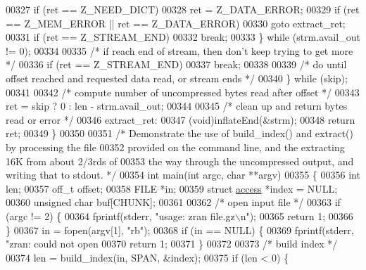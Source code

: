 \begin{DoxyCode}
00327             \textcolor{keywordflow}{if} (ret == Z\_NEED\_DICT)
00328                 ret = Z\_DATA\_ERROR;
00329             \textcolor{keywordflow}{if} (ret == Z\_MEM\_ERROR || ret == Z\_DATA\_ERROR)
00330                 \textcolor{keywordflow}{goto} extract\_ret;
00331             \textcolor{keywordflow}{if} (ret == Z\_STREAM\_END)
00332                 \textcolor{keywordflow}{break};
00333         \} \textcolor{keywordflow}{while} (strm.avail\_out != 0);
00334 
00335         \textcolor{comment}{/* if reach end of stream, then don't keep trying to get more */}
00336         \textcolor{keywordflow}{if} (ret == Z\_STREAM\_END)
00337             \textcolor{keywordflow}{break};
00338 
00339         \textcolor{comment}{/* do until offset reached and requested data read, or stream ends */}
00340     \} \textcolor{keywordflow}{while} (skip);
00341 
00342     \textcolor{comment}{/* compute number of uncompressed bytes read after offset */}
00343     ret = skip ? 0 : len - strm.avail\_out;
00344 
00345     \textcolor{comment}{/* clean up and return bytes read or error */}
00346   extract\_ret:
00347     (void)inflateEnd(&strm);
00348     \textcolor{keywordflow}{return} ret;
00349 \}
00350 
00351 \textcolor{comment}{/* Demonstrate the use of build\_index() and extract() by processing the file}
00352 \textcolor{comment}{   provided on the command line, and the extracting 16K from about 2/3rds of}
00353 \textcolor{comment}{   the way through the uncompressed output, and writing that to stdout. */}
00354 \textcolor{keywordtype}{int} main(\textcolor{keywordtype}{int} argc, \textcolor{keywordtype}{char} **argv)
00355 \{
00356     \textcolor{keywordtype}{int} len;
00357     off\_t offset;
00358     FILE *in;
00359     \textcolor{keyword}{struct }\hyperlink{structaccess}{access} *index = NULL;
00360     \textcolor{keywordtype}{unsigned} \textcolor{keywordtype}{char} buf[CHUNK];
00361 
00362     \textcolor{comment}{/* open input file */}
00363     \textcolor{keywordflow}{if} (argc != 2) \{
00364         fprintf(stderr, \textcolor{stringliteral}{"usage: zran file.gz\(\backslash\)n"});
00365         \textcolor{keywordflow}{return} 1;
00366     \}
00367     in = fopen(argv[1], \textcolor{stringliteral}{"rb"});
00368     \textcolor{keywordflow}{if} (in == NULL) \{
00369         fprintf(stderr, \textcolor{stringliteral}{"zran: could not open %
00370         \textcolor{keywordflow}{return} 1;
00371     \}
00372 
00373     \textcolor{comment}{/* build index */}
00374     len = build\_index(in, SPAN, &index);
00375     \textcolor{keywordflow}{if} (len < 0) \{
}
\end{DoxyCode}
